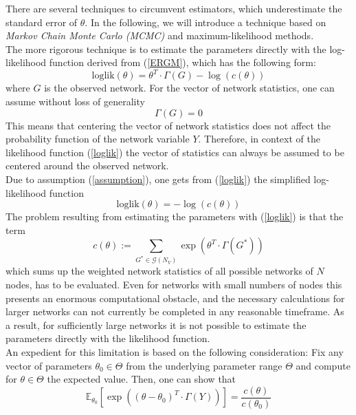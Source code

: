 \documentclass[headsepline=true, abstracton]{scrartcl}
\begin{document}
There are several techniques to circumvent estimators, which underestimate the standard error of $\theta$. In the following, we will introduce a technique based on \textit{Markov Chain Monte Carlo (MCMC)} and maximum-likelihood methods.\\[0.3cm]
The more rigorous technique is to estimate the parameters directly with the log-likelihood function derived from (\ref{ERGM}), which has the following form:
%
\begin{equation}
\text{loglik}(\theta)=\theta^T \cdot \Gamma(G)-\log(c(\theta))
\label{loglik}
\end{equation}
%
where $G$ is the observed network. For the vector of network statistics, one can assume without loss of generality
%
\begin{equation}
\Gamma(G)=0 \label{assumption}
\end{equation}
%
This means that centering the vector of network statistics does not affect the probability function of the network variable $Y$. Therefore, in context of the likelihood function (\ref{loglik}) the vector of statistics can always be assumed to be centered around the observed network.\\
Due to assumption (\ref{assumption}), one gets from (\ref{loglik}) the simplified log-likelihood function
%
\begin{equation}
\text{loglik}(\theta)= -\log(c(\theta))
\label{vloglik}
\end{equation}
%
The problem resulting from estimating the parameters with (\ref{loglik}) is that the term
%
$$c(\theta):= \sum_{G^* \in \mathcal{G}(N_V)} \exp(\theta^T \cdot \Gamma(G^*))$$ 
%
which sums up the weighted network statistics of all possible networks of $N$ nodes, has to be evaluated. Even for networks with small numbers of nodes this presents an enormous computational obstacle, and the necessary calculations for larger networks can not currently be completed in any reasonable timeframe.
As a result, for sufficiently large networks it is not possible to estimate the parameters directly with the likelihood function.
\\[0.3cm]
An expedient for this limitation is based on the following consideration: Fix any vector of parameters $\theta_0 \in \Theta$ from the underlying parameter range $\Theta$ and compute for $\theta \in \Theta$ the expected value. Then, one can show that
%
\begin{equation*}
\mathbb{E}_{\theta_0}\left[ \exp\left((\theta - \theta_0)^T \cdot \Gamma(Y)\right) \right]=\frac{c(\theta)}{c(\theta_0)}
\end{equation*}
\end{document}
